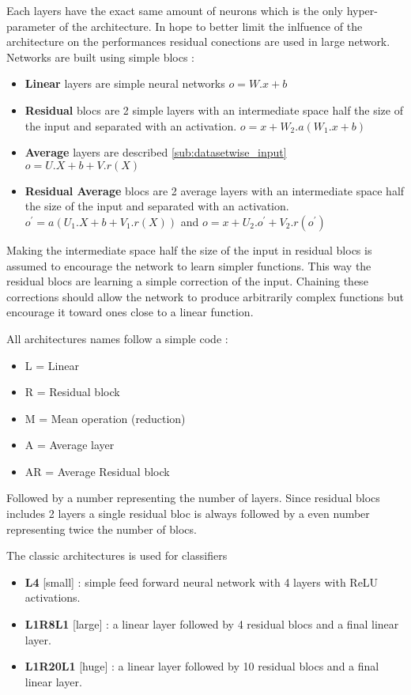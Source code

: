 Each layers have the exact same amount of neurons which is the only hyper-parameter of the architecture.
In hope to better limit the inlfuence of the architecture on the performances residual conections are used in large network.
Networks are built using simple blocs :
\begin{itemize}
	\item \textbf{Linear} layers are simple neural networks $o = W.x + b$
	\item \textbf{Residual} blocs are 2 simple layers with an intermediate space half the size of the input and separated with an activation. $o = x + W_2 . a(W_1.x + b)$
	\item \textbf{Average} layers are described \autoref{sub:datasetwise_input} $o = U.X+b+V.r(X)$
	\item \textbf{Residual Average} blocs are 2 average layers with an intermediate space half the size of the input and separated with an activation. $o^\prime = a( U_1.X+b+V_1.r(X) )$ and $o = x + U_2.o^\prime + V_2.r(o^\prime) $
\end{itemize}
Making the intermediate space half the size of the input in residual blocs is assumed to encourage the network to learn simpler functions.
This way the residual blocs are learning a simple correction of the input.
Chaining these corrections should allow the network to produce arbitrarily complex functions but encourage it toward ones close to a linear function.

All architectures names follow a simple code :
\begin{itemize}
	\item L = Linear
	\item R = Residual block
	\item M = Mean operation (reduction)
	\item A = Average layer
	\item AR = Average Residual block
\end{itemize}
Followed by a number representing the number of layers.
Since residual blocs includes 2 layers a single residual bloc is always followed by a even number representing twice the number of blocs.

The classic architectures is used for classifiers
\begin{itemize}
	\item \textbf{L4} [small] : simple feed forward neural network with 4 layers with ReLU activations.
	\item \textbf{L1R8L1} [large] : a linear layer followed by 4 residual blocs and a final linear layer.
	\item \textbf{L1R20L1} [huge] : a linear layer followed by 10 residual blocs and a final linear layer.
\end{itemize}

